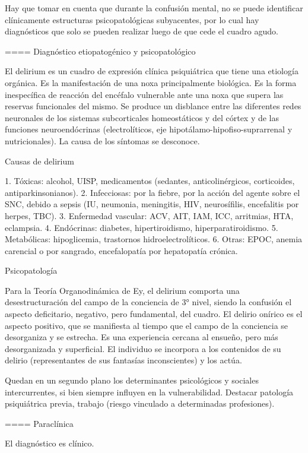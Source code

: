 \documentclass[encares.tex]{subfiles}
\begin{document}
Hay que tomar en cuenta que durante la confusión mental, no se puede identificar clínicamente estructuras psicopatológicas subyacentes, por lo cual hay diagnósticos que solo se pueden realizar luego de que cede el cuadro agudo.

==== Diagnóstico etiopatogénico y psicopatológico

El delirium es un cuadro de expresión clínica psiquiátrica que tiene una etiología orgánica. Es la manifestación de una noxa principalmente biológica. Es la forma inespecífica de reacción del encéfalo vulnerable ante una noxa que supera las reservas funcionales del mismo. Se produce un disblance entre las diferentes redes neuronales de los sistemas subcorticales homeostáticos y del córtex y de las funciones neuroendócrinas (electrolíticos, eje hipotálamo-hipofiso-suprarrenal y nutricionales). La causa de los síntomas se desconoce.

Causas de delirium

1. Tóxicas: alcohol, UISP, medicamentos (sedantes, anticolinérgicos, corticoides, antiparkinsonianos).
2. Infecciosas: por la fiebre, por la acción del agente sobre el SNC, debido a sepsis (IU, neumonia, meningitis, HIV, neurosífilis, encefalitis por herpes, TBC).
3. Enfermedad vascular: ACV, AIT, IAM, ICC, arritmias, HTA, eclampsia.
4. Endócrinas: diabetes, hipertiroidismo, hiperparatiroidismo.
5. Metabólicas: hipoglicemia, trastornos hidroelectrolíticos.
6. Otras: EPOC, anemia carencial o por sangrado, encefalopatía por hepatopatía crónica.

Psicopatología

Para la Teoría Organodinámica de Ey, el delirium comporta una desestructuración del campo de la conciencia de 3° nivel, siendo la confusión el aspecto deficitario, negativo, pero fundamental, del cuadro. El delirio onírico es el aspecto positivo, que se manifiesta al tiempo que el campo de la conciencia se desorganiza y se estrecha. Es una experiencia cercana al ensueño, pero más desorganizada y superficial. El individuo se incorpora a los contenidos de su delirio (representantes de sus fantasías inconscientes) y los actúa.

Quedan en un segundo plano los determinantes psicológicos y sociales intercurrentes, si bien siempre influyen en la vulnerabilidad. Destacar patología psiquiátrica previa, trabajo (riesgo vinculado a determinadas profesiones).

==== Paraclínica

El diagnóstico es clínico.
\end{document}
